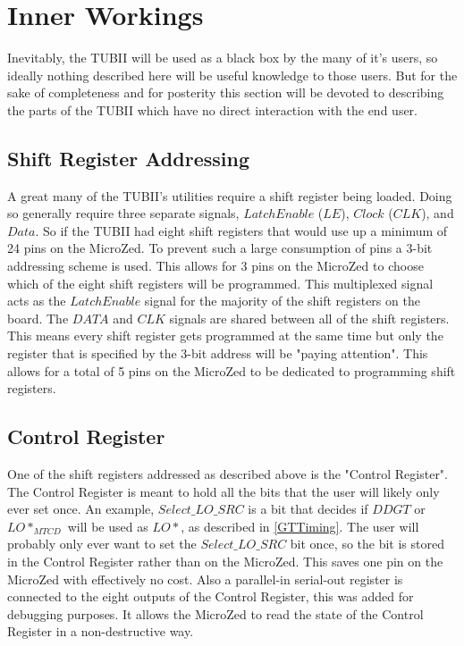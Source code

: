 \documentclass[11pt,a4paper]{article}
\begin{document}
\section{Inner Workings}
Inevitably, the TUBII will be used as a black box by the many of it's users, so ideally nothing described here will be useful knowledge to those users. But for the sake of completeness and for posterity this section will be devoted to describing the parts of the TUBII which have no direct interaction with the end user.

\subsection{Shift Register Addressing}
\label{SR_Addr}
A great many of the TUBII's utilities require a shift register being loaded. Doing so generally require three separate signals, $Latch Enable$ ($LE$), $Clock$ ($CLK$), and $Data$.
So if the TUBII had eight shift registers that would use up a minimum of 24 pins on the MicroZed. To prevent such a large consumption of pins a 3-bit addressing scheme is used. This allows for 3 pins on the MicroZed to choose which of the eight shift registers will be programmed. This multiplexed signal acts as the $LatchEnable$ signal for the majority of the shift registers on the board. The $DATA$ and $CLK$ signals are shared between all of the shift registers. This means every shift register gets programmed at the same time but only the register that is specified by the 3-bit address will be "paying attention". This allows for a total of 5 pins on the MicroZed to be dedicated to programming shift registers.
\subsection{Control Register}
One of the shift registers addressed as described above is the "Control Register". The Control Register is meant to hold all the bits that the user will likely only ever set once. An example, $Select\_LO\_SRC$ is a bit that decides if $DDGT$ or $LO*_{MTCD}$ will be used as $LO*$, as described in \ref{GTTiming}. The user will probably only ever want to set the $Select\_LO\_SRC$ bit once, so the bit is stored in the Control Register rather than on the MicroZed. This saves one pin on the MicroZed with effectively no cost. Also a parallel-in serial-out register is connected to the eight outputs of the Control Register, this was added for debugging purposes. It allows the MicroZed to read the state of the Control Register in a non-destructive way. 
\end{document}
